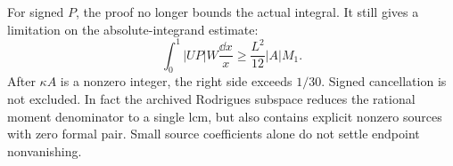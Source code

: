 For signed $P$, the proof no longer bounds the actual integral.
It still gives a limitation on the absolute-integrand estimate:
\[
 \int_0^1|UP|W\frac{\dd x}{x}\geq
       \frac{L^2}{12}|A|M_1.
\]
After $\kappa A$ is a nonzero integer, the right side exceeds $1/30$.
Signed cancellation is not excluded. In fact the archived Rodrigues
subspace  reduces the rational moment denominator to a
single lcm, but also contains explicit nonzero sources with zero formal
pair. Small source coefficients alone do not settle endpoint nonvanishing.
